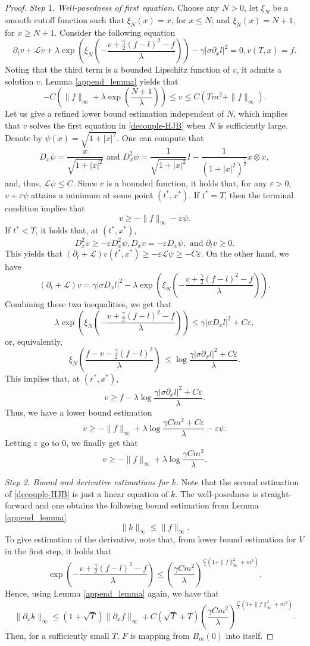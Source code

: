 \documentclass[11pt]{article}
\begin{document}
\begin{proof}
{\it Step $1$. Well-posedness of first equation.} Choose any $N>0$, let $\xi_N$ be a smooth cutoff function such that $\xi_N(x)=x$, for $x\le N$; and $\xi_N(x)=N+1$, for $x\ge N+1$. Consider the following equation 
$$
\partial_t v+\mathcal Lv+\lambda\exp(\xi_N(-\frac{v+\frac{\gamma}{2}(f-l)^2-f}{\lambda}))-\gamma |\sigma \partial_x l|^2=0, v(T,x)=f.
$$
Noting that the third term is a bounded Lipschitz function of $v$, it admits a solution $v$. Lemma \ref{append_lemma} yields that 
$$
-C( \|f\|_{\infty}+\lambda \exp(\frac{N+1}{\lambda}))\le v\le C(Tm^2+\|f\|_{\infty}).
$$
Let us give a refined lower bound estimation independent of $N$, which implies that $v$ solves the first equation in \eqref{decouple-HJB} when $N$ is sufficiently large.
Denote by $\psi(x)=\sqrt{1+|x|^2}$.  One can compute that 
$$
D_x \psi=\frac{x}{\sqrt{1+|x|^2}}\text{ and }  D^2_x \psi= \frac{1}{\sqrt{1+|x|^2}}I -\frac{1}{\left(1+|x|^2\right)^{\frac12}} x\otimes x,
$$
and, thus, $\mathcal L \psi \le C$. Since $v$ is a bounded function, it holds that, for any $\varepsilon>0$, $v+\varepsilon\psi$ attains a minimum at some point $(t^*,x^*)$. If $t^*=T$, then the terminal condition implies that 
$$v\ge -\|f\|_\infty-\varepsilon \psi.
$$
If $t^*<T$, it holds that, at $(t^*,x^*)$,
$$
D^2_x v \ge -\varepsilon D^2_x \psi, D_x v=-\varepsilon D_x \psi,  \text{ and } \partial_t v \ge 0. 
$$
This yields that  $(\partial_t +\mathcal L)v(t^*,x^*) \ge-\varepsilon \mathcal L\psi \ge -C\varepsilon$. On the other hand, we have  
$$
(\partial_t +\mathcal L)v=\gamma |\sigma D_x l|^2-\lambda\exp(\xi_N(-\frac{v+\frac{\gamma}{2}(f-l)^2-f}{\lambda})).
$$
Combining these two inequalities, we get that 
$$
\lambda\exp(\xi_N(-\frac{v+\frac{\gamma}{2}(f-l)^2-f}{\lambda})) \le \gamma |\sigma D_x l|^2 +C\varepsilon,
$$
or, equivalently,
$$
\xi_N(\frac{f-v-\frac{\gamma}{2}(f-l)^2}{\lambda})\ \le \log \frac{\gamma|\sigma \partial_x l|^2+C\varepsilon}{\lambda}.
$$
This implies that,  at $(r^*,x^*)$,
$$
v \ge f-\lambda  \log \frac{\gamma|\sigma \partial_x l|^2+C\varepsilon}{\lambda}.
$$
Thus, we have a lower bound estimation
$$
v\ge -\|f\|_\infty +\lambda \log \frac{\gamma Cm^2+C\varepsilon}{\lambda}-\varepsilon \psi.
$$
Letting $\varepsilon$ go to $0$, we finally get that 
$$
v\ge -\|f\|_\infty +\lambda \log \frac{\gamma Cm^2}{\lambda}.
$$

{\it Step 2. Bound and derivative estimations for $k$.} Note that the second estimation of \eqref{decouple-HJB} is just a linear equation of $k$. The well-posedness is straight-forward and one obtains the following bound estimation from Lemma \ref{append_lemma} 
$$
\|k\|_{\infty} \le \|f\|_{\infty}.
$$
To give estimation of the derivative, note that, from lower bound estimation for $V$ in the first step, it holds that 
$$
\exp(-\frac{v+\frac\gamma2(f-l)^2-f}{\lambda}) \le (\frac{\gamma Cm^2}{\lambda})^{\frac{C}{\lambda}(1+\|f\|^2_\infty+m^2)}.
$$
Hence, using Lemma \ref{append_lemma} again, we have that 
$$
\|\partial_x k\|_{\infty} \le (1+\sqrt{T})\|\partial_x f\|_{\infty}+C(\sqrt{T}+T)(\frac{\gamma Cm^2}{\lambda})^{\frac{C}{\lambda}(1+\|f\|^2_\infty+m^2)}. 
$$
Then, for a sufficiently small $T$, $F$ is mapping from $B_m(0)$ into itself. 


\end{proof}
\end{document}
